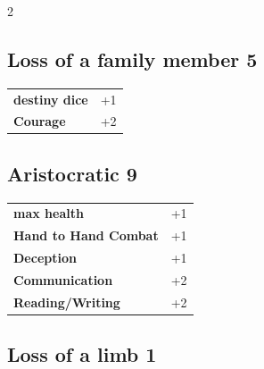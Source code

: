 \begin{multicols}{2}
\begin{tcolorbox}
\end{tcolorbox}

\begin{tcolorbox}
    \subsection*{Loss of a family member \hfill \small{5 }}
    \tcblower




\begin{tabular}{@{}ll@{}}
    \textbf{destiny dice} & +1\\
    \textbf{Courage} & +2\\
\end{tabular}


\end{tcolorbox}

\begin{tcolorbox}
    \subsection*{Aristocratic \hfill \small{9 }}
    \tcblower




\begin{tabular}{@{}ll@{}}
    \textbf{max health} & +1\\
    \textbf{Hand to Hand Combat} & +1\\
    \textbf{Deception} & +1\\
    \textbf{Communication} & +2\\
    \textbf{Reading/Writing} & +2\\
\end{tabular}


\end{tcolorbox}

\begin{tcolorbox}
    \subsection*{Loss of a limb \hfill \small{1 }}
    \tcblower





\end{tcolorbox}
\end{multicols}
